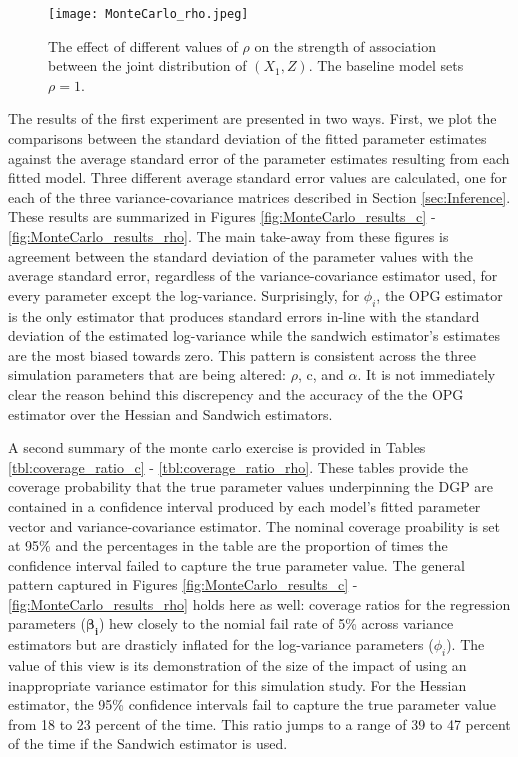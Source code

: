 \documentclass[12pt]{article}
\theoremstyle{definition}
\begin{document}
\begin{figure}[!ht]
    \centering
    \texttt{[image: MonteCarlo\_rho.jpeg]}
    \caption{The effect of different values of $\rho$ on the strength of association between the joint distribution of $(X_{1}, Z)$. The baseline model sets $\rho = 1$.} 
    \label{fig:MC_rho}
\end{figure}

The results of the first experiment are presented in two ways. First, we plot the comparisons between the standard deviation of the fitted parameter estimates against the average standard error of the parameter estimates resulting from each fitted model. Three different average standard error values are calculated, one for each of the three variance-covariance matrices described in Section \ref{sec:Inference}. These results are summarized in Figures \ref{fig:MonteCarlo_results_c} - \ref{fig:MonteCarlo_results_rho}. The main take-away from these figures is agreement between the standard deviation of the parameter values with the average standard error, regardless of the variance-covariance estimator used, for every parameter except the log-variance. Surprisingly, for $\phi_{i}$, the OPG estimator is the only estimator that produces standard errors in-line with the standard deviation of the estimated log-variance while the sandwich estimator's estimates are the most biased towards zero. This pattern is consistent across the three simulation parameters that are being altered: $\rho$, c, and $\alpha$. It is not immediately clear the reason behind this discrepency and the accuracy of the the OPG estimator over the Hessian and Sandwich estimators. 

\bigskip

A second summary of the monte carlo exercise is provided in Tables \ref{tbl:coverage_ratio_c} - \ref{tbl:coverage_ratio_rho}. These tables provide the coverage probability that the true parameter values underpinning the DGP are contained in a confidence interval produced by each model's fitted parameter vector and variance-covariance estimator. The nominal coverage proability is set at 95\% and the percentages in the table are the proportion of times the confidence interval failed to capture the true parameter value. The general pattern captured in Figures \ref{fig:MonteCarlo_results_c} - \ref{fig:MonteCarlo_results_rho} holds here as well: coverage ratios for the regression parameters ($\boldsymbol{\beta_{i}}$) hew closely to the nomial fail rate of 5\% across variance estimators but are drasticly inflated for the log-variance parameters ($\phi_{i}$). The value of this view is its demonstration of the size of the impact of using an inappropriate variance estimator for this simulation study. For the Hessian estimator, the 95\% confidence intervals fail to capture the true parameter value from 18 to 23 percent of the time. This ratio jumps to a range of 39 to 47 percent of the time if the Sandwich estimator is used.
\end{document}
